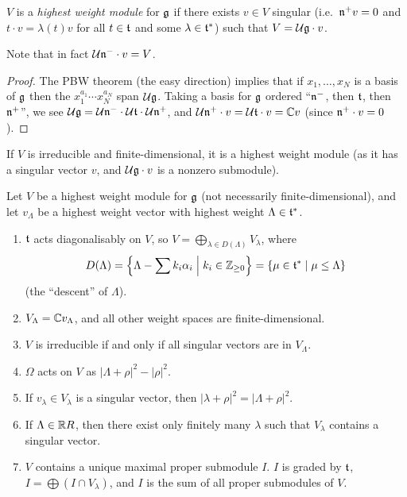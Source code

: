 \begin{definition}
$V$ is a \emph{highest weight module} for $\mathfrak{g}$ if there exists $v \in V$
singular (i.e.\ $\mathfrak{n}^+v = 0$ and $t \cdot v = \lambda(t)v$ for all $t \in \mathfrak{t}$
and some $\lambda \in \mathfrak{t}^*$) such that $V = \mathcal{U}\mathfrak{g} \cdot v$.
\end{definition}

Note that in fact $\mathcal{U}\mathfrak{n}^- \cdot v = V$.

\begin{proof}
The PBW theorem (the easy direction) implies that if $x_1, \dots, x_N$ is a
basis of $\mathfrak{g}$ then the $x_1^{a_1}\cdots x_N^{a_N}$ span $\mathcal{U}\mathfrak{g}$. Taking a basis
for $\mathfrak{g}$ ordered ``$\mathfrak{n}^-$, then $\mathfrak{t}$, then $\mathfrak{n}^+$'', we see
$\mathcal{U}\mathfrak{g} = \mathcal{U}\mathfrak{n}^- \cdot \mathcal{U}\mathfrak{t} \cdot \mathcal{U}\mathfrak{n}^+$, and
$\mathcal{U}\mathfrak{n}^+ \cdot v = \mathcal{U}\mathfrak{t} \cdot v = \mathbb{C} v$ (since $\mathfrak{n}^+ \cdot v = 0$).
\end{proof}

\begin{remark}
If $V$ is irreducible and finite-dimensional, it is a highest weight module
(as it has a singular vector $v$, and $\mathcal{U}\mathfrak{g} \cdot v$ is a nonzero submodule).
\end{remark}

\begin{proposition}
Let $V$ be a highest weight module for $\mathfrak{g}$ (not necessarily
finite-dimensional), and let $v_\Lambda$ be a highest weight vector with
highest weight $\Lambda \in \mathfrak{t}^*$.
\begin{enumerate}
  \item $\mathfrak{t}$ acts diagonalisably on $V$, so
    $V = \bigoplus_{\lambda \in D(\Lambda)} V_\lambda$, where
    \[
      D(\Lambda) = \Bigl\{\Lambda - \sum k_i\alpha_i \Bigm| k_i \in \mathbb{Z}_{\geq 0}\Bigr\}
                 = \{\mu \in \mathfrak{t}^* \mid \mu \leq \Lambda\}
    \]
    (the ``descent'' of $\Lambda$).
  \item $V_\Lambda = \mathbb{C} v_\Lambda$, and all other weight spaces are
    finite-dimensional.
  \item $V$ is irreducible if and only if all singular vectors are in
    $V_\Lambda$.
  \item $\Omega$ acts on $V$ as $|\Lambda + \rho|^2 - |\rho|^2$.
  \item If $v_\lambda \in V_\lambda$ is a singular vector, then
    $|\lambda + \rho|^2 = |\Lambda + \rho|^2$.
  \item If $\Lambda \in \mathbb{R} R$, then there exist only finitely many $\lambda$
    such that $V_\lambda$ contains a singular vector.
  \item $V$ contains a unique maximal proper submodule $I$. $I$ is graded by
    $\mathfrak{t}$, $I = \bigoplus (I \cap V_\lambda)$, and $I$ is the sum of all
    proper submodules of $V$.
\end{enumerate}
\end{proposition}

